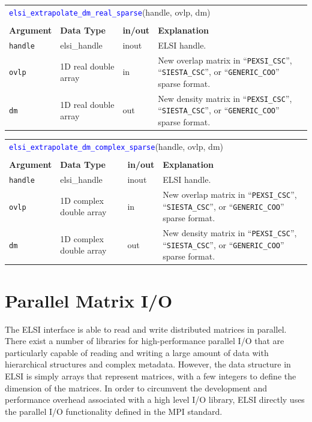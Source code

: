 \documentclass{report}
\newcommand{\api}[1]{\textcolor{blue}{\texttt{#1}}}
\begin{document}
\begin{tabular}[]{|p{20mm}|p{40mm}|p{10mm}|p{92mm}|}
\multicolumn{4}{l}{\api{elsi\_extrapolate\_dm\_real\_sparse}(handle, ovlp, dm)}\\
\multicolumn{4}{l}{}\\
\hline
\multicolumn{1}{|l|}{\textbf{Argument}} & \multicolumn{1}{l|}{\textbf{Data Type}} & \multicolumn{1}{l|}{\textbf{in/out}} & \multicolumn{1}{l|}{\textbf{Explanation}}\\
\hline
\texttt{handle} & elsi\_handle         & inout & ELSI handle.\\
\hline
\texttt{ovlp}   & 1D real double array & in    & New overlap matrix in ``\texttt{PEXSI\_CSC}'', ``\texttt{SIESTA\_CSC}'', or ``\texttt{GENERIC\_COO}'' sparse format.\\
\hline
\texttt{dm}     & 1D real double array & out   & New density matrix in ``\texttt{PEXSI\_CSC}'', ``\texttt{SIESTA\_CSC}'', or ``\texttt{GENERIC\_COO}'' sparse format.\\
\hline
\end{tabular}

\begin{tabular}[]{|p{20mm}|p{40mm}|p{10mm}|p{92mm}|}
\multicolumn{4}{l}{\api{elsi\_extrapolate\_dm\_complex\_sparse}(handle, ovlp, dm)}\\
\multicolumn{4}{l}{}\\
\hline
\multicolumn{1}{|l|}{\textbf{Argument}} & \multicolumn{1}{l|}{\textbf{Data Type}} & \multicolumn{1}{l|}{\textbf{in/out}} & \multicolumn{1}{l|}{\textbf{Explanation}}\\
\hline
\texttt{handle} & elsi\_handle            & inout & ELSI handle.\\
\hline
\texttt{ovlp}   & 1D complex double array & in    & New overlap matrix in ``\texttt{PEXSI\_CSC}'', ``\texttt{SIESTA\_CSC}'', or ``\texttt{GENERIC\_COO}'' sparse format.\\
\hline
\texttt{dm}     & 1D complex double array & out   & New density matrix in ``\texttt{PEXSI\_CSC}'', ``\texttt{SIESTA\_CSC}'', or ``\texttt{GENERIC\_COO}'' sparse format.\\
\hline
\end{tabular}

\section{Parallel Matrix I/O}
\label{sec:rw}
The ELSI interface is able to read and write distributed matrices in parallel. There exist a number of libraries for high-performance parallel I/O that are particularly capable of reading and writing a large amount of data with hierarchical structures and complex metadata. However, the data structure in ELSI is simply arrays that represent matrices, with a few integers to define the dimension of the matrices. In order to circumvent the development and performance overhead associated with a high level I/O library, ELSI directly uses the parallel I/O functionality defined in the MPI standard.
\end{document}
